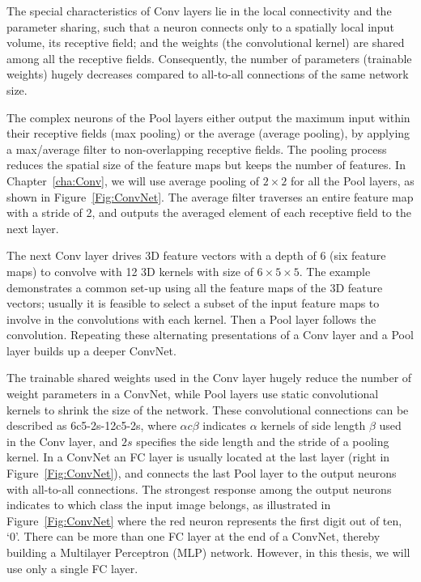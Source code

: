 The special characteristics of Conv layers lie in the local connectivity and the parameter sharing, such that a neuron connects only to a spatially local input volume, its receptive field; and the weights (the convolutional kernel) are shared among all the receptive fields.
Consequently, the number of parameters (trainable weights) hugely decreases compared to all-to-all connections of the same network size. 

The complex neurons of the Pool layers either output the maximum input within their receptive fields (max pooling) or the average (average pooling), by applying a max/average filter to non-overlapping receptive fields.
The pooling process reduces the spatial size of the feature maps but keeps the number of features.
In Chapter~\ref{cha:Conv}, we will use average pooling of $2\times2$ for all the Pool layers, as shown in Figure~\ref{Fig:ConvNet}.
The average filter traverses an entire feature map with a stride of 2, and outputs the averaged element of each receptive field to the next layer.

The next Conv layer drives 3D feature vectors with a depth of 6 (six feature maps) to convolve with 12 3D kernels with size of $6\times5\times5$.
The example demonstrates a common set-up using all the feature maps of the 3D feature vectors; usually it is feasible to select a subset of the input feature maps to involve in the convolutions with each kernel.
Then a Pool layer follows the convolution.
Repeating these alternating presentations of a Conv layer and a Pool layer builds up a deeper ConvNet.

The trainable shared weights used in the Conv layer hugely reduce the number of weight parameters in a ConvNet, while Pool layers use static convolutional kernels to shrink the size of the network.
These convolutional connections can be described as 6c5-2s-12c5-2s, where $\alpha c \beta$ indicates $\alpha$ kernels of side length $\beta$ used in the Conv layer, and $2s$ specifies the side length and the stride of a pooling kernel.
In a ConvNet an FC layer is usually located at the last layer (right in Figure~\ref{Fig:ConvNet}), and connects the last Pool layer to the output neurons with all-to-all connections.
The strongest response among the output neurons indicates to which class the input image belongs, as illustrated in Figure~\ref{Fig:ConvNet} where the red neuron represents the first digit out of ten, `0'.
There can be more than one FC layer at the end of a ConvNet, thereby building a Multilayer Perceptron (MLP) network.
However, in this thesis, we will use only a single FC layer.



